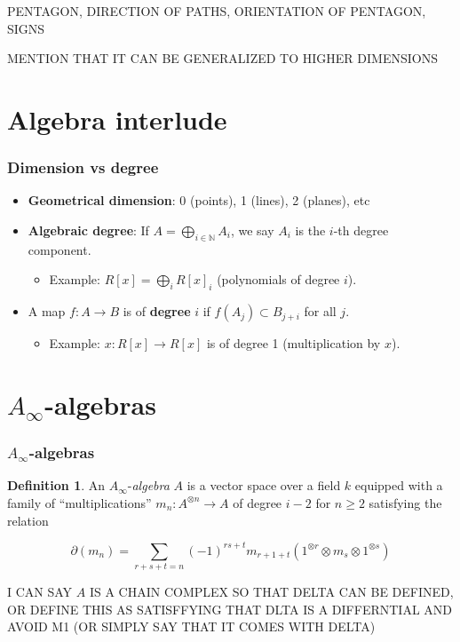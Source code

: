 \documentclass{beamer}
\theoremstyle{definition}
\newtheorem{defi}{Definition}
\begin{document}
\begin{frame}
PENTAGON, DIRECTION OF PATHS, ORIENTATION OF PENTAGON, SIGNS

MENTION THAT IT CAN BE GENERALIZED TO HIGHER DIMENSIONS
\end{frame}

\section{Algebra interlude}
\begin{frame}
\frametitle{Dimension vs degree}

\begin{itemize}
\item<1-> \textbf{Geometrical dimension}: 0 (points), 1 (lines), 2 (planes), etc
\item<2-> \textbf{Algebraic degree}: If $A=\bigoplus_{i\in\mathbb{N}} A_i$, we say $A_i$ is the $i$-th degree component.
\begin{itemize}
\item<3-> Example: $R[x]=\bigoplus_i R[x]_i$ (polynomials of degree $i$).
\end{itemize}
\item<4-> A map $f:A\to B$ is of \textbf{degree} $i$ if $f(A_j)\subset B_{j+i}$ for all $j$.
\begin{itemize}
\item<5-> Example: $x:R[x]\to R[x]$ is of degree 1 (multiplication by $x$).
\end{itemize}
\end{itemize}
\end{frame}

\section{$A_\infty$-algebras}
\begin{frame}
\frametitle{$A_\infty$-algebras}
\begin{defi}
An $A_\infty$-\emph{algebra} $A$ is a vector space over a field $k$ equipped with a family of ``multiplications'' $m_n:A^{\otimes n}\to A$ of degree $i-2$ for $n\geq 2$ satisfying the relation

\[\partial(m_n)=\sum_{r+s+t=n}(-1)^{rs+t}m_{r+1+t}(1^{\otimes r}\otimes m_s\otimes 1^{\otimes s})\] %
\end{defi}

I CAN SAY $A$ IS A CHAIN COMPLEX SO THAT DELTA CAN BE DEFINED, OR DEFINE THIS AS SATISFFYING THAT DLTA IS A DIFFERNTIAL AND AVOID M1 (OR  SIMPLY SAY THAT IT COMES WITH DELTA)
\end{frame}
\end{document}
